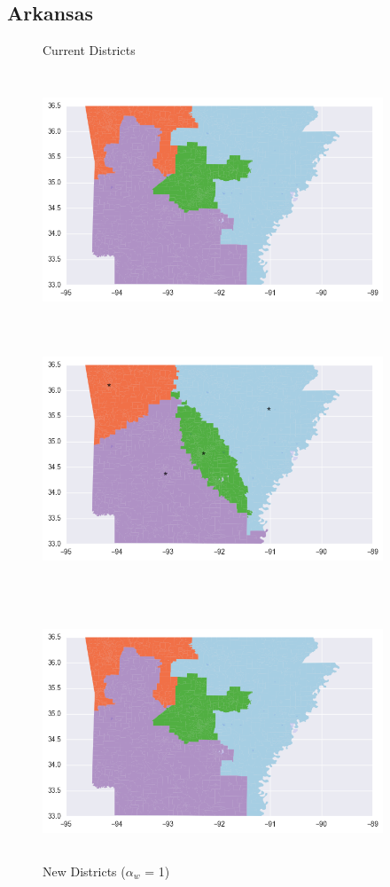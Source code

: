 \clearpage
\newpage

\subsection{Arkansas}
\begin{figure}[htb!] \centering
\caption{ Current Districts }
\includegraphics[width=4in,height=3in,keepaspectratio]{../maps/AR/static/before.png}
\includegraphics[width=4in,height=3in,keepaspectratio]{../maps/AR/static/0_0_after.png}
\caption{ New Districts ($\alpha_w$ = 1) }
\includegraphics[width=4in,height=3in,keepaspectratio]{../maps/AR/static/before.png}

\end{figure}
